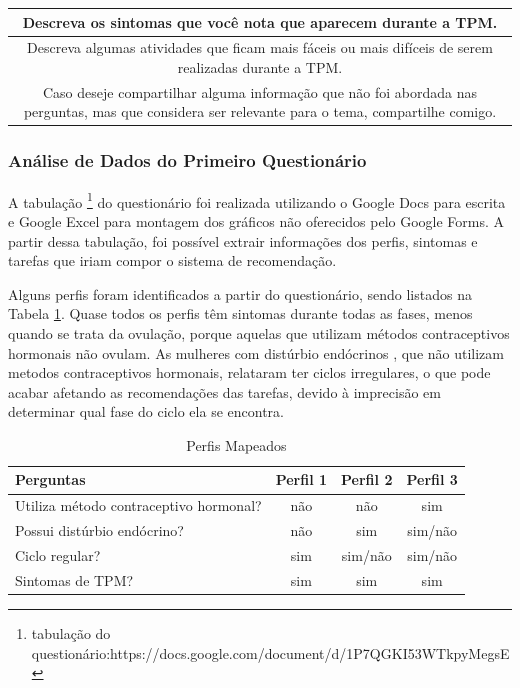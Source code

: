 \begin{table}[ht]
\begin{tabular}{c}
        \midrule
        \begin{minipage} [t] {1\textwidth} Descreva os sintomas que você nota que aparecem durante a TPM.\end{minipage}\\
        \midrule
        \begin{minipage} [t] {1\textwidth} Descreva algumas atividades que ficam mais fáceis ou mais difíceis de serem realizadas durante a TPM.\end{minipage}\\
        \midrule
        \begin{minipage} [t] {1\textwidth} Caso deseje compartilhar alguma informação que não foi abordada nas perguntas, mas que considera ser relevante para o tema, compartilhe comigo. \end{minipage}\\

        \bottomrule
    \end{tabular} 
\end{table}


\subsubsection{Análise de Dados do Primeiro Questionário}
\label{vsf1}

A tabulação \footnote{tabulação do questionário:https://docs.google.com/document/d/1P7QGKI53WTkpyMegsE} do 
questionário foi realizada utilizando o Google Docs para escrita e Google Excel para montagem 
dos gráficos não oferecidos 
pelo Google Forms. A partir dessa tabulação, foi possível extrair informações dos perfis, 
sintomas e tarefas que iriam compor o sistema de recomendação.

Alguns perfis foram identificados a partir do questionário, sendo listados na Tabela \ref{tab09}. 
Quase todos os perfis têm sintomas durante todas as fases, menos quando se trata da ovulação, porque aquelas 
que utilizam métodos contraceptivos hormonais não ovulam. As mulheres com distúrbio endócrinos 
, que não utilizam metodos contraceptivos hormonais, relataram ter ciclos irregulares, o que pode acabar afetando 
as recomendações das tarefas, devido à imprecisão em determinar qual fase do ciclo ela se encontra.

\begin{table}[] 
    \centering
    \caption{Perfis Mapeados}
    \label{tab09} 
    \begin{tabular}{|l|c|c|c|}
    \hline
    \rowcolor[HTML]{C0C0C0} 
     Perguntas & Perfil 1 & Perfil 2 & Perfil 3  \\ \hline
     Utiliza método contraceptivo hormonal?& não & não & sim \\ \hline
    \rowcolor[HTML]{EFEFEF} 
    Possui distúrbio endócrino? & não & sim & sim/não \\ \hline
    Ciclo regular? & sim & sim/não & sim/não  \\ \hline
    \rowcolor[HTML]{EFEFEF} 
    Sintomas de TPM? & sim & sim & sim \\ \hline
    \end{tabular}
    \end{table}



